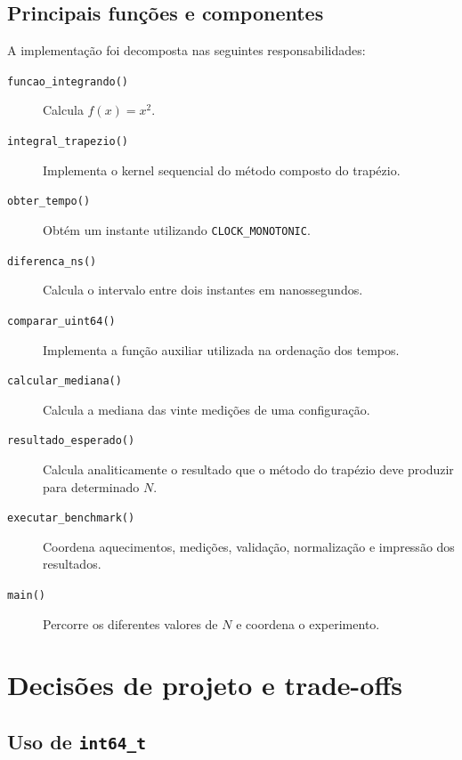 \subsection{Principais funções e componentes}

A implementação foi decomposta nas seguintes responsabilidades:

\begin{description}

    \item[\texttt{funcao\_integrando()}]
    Calcula \(f(x)=x^2\).

    \item[\texttt{integral\_trapezio()}]
    Implementa o kernel sequencial do método composto do trapézio.

    \item[\texttt{obter\_tempo()}]
    Obtém um instante utilizando \texttt{CLOCK\_MONOTONIC}.

    \item[\texttt{diferenca\_ns()}]
    Calcula o intervalo entre dois instantes em nanossegundos.

    \item[\texttt{comparar\_uint64()}]
    Implementa a função auxiliar utilizada na ordenação dos tempos.

    \item[\texttt{calcular\_mediana()}]
    Calcula a mediana das vinte medições de uma configuração.

    \item[\texttt{resultado\_esperado()}]
    Calcula analiticamente o resultado que o método do trapézio deve
    produzir para determinado \(N\).

    \item[\texttt{executar\_benchmark()}]
    Coordena aquecimentos, medições, validação, normalização e impressão
    dos resultados.

    \item[\texttt{main()}]
    Percorre os diferentes valores de \(N\) e coordena o experimento.

\end{description}


\section{Decisões de projeto e trade-offs}

\label{sec:atvd04-decisoes}

\subsection{Uso de \texttt{int64\_t}}

